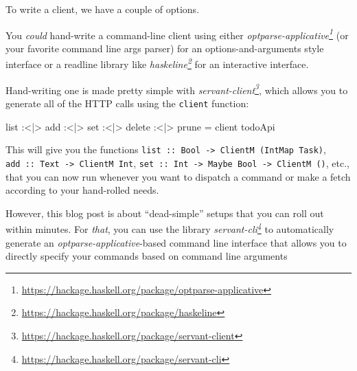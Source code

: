 \documentclass[]{article}
\newenvironment{Shaded}{}{}
\newcommand{\NormalTok}[1]{#1}
\newcommand{\OperatorTok}[1]{\textcolor[rgb]{0.40,0.40,0.40}{#1}}
\newcommand{\OtherTok}[1]{\textcolor[rgb]{0.00,0.44,0.13}{#1}}
\renewcommand{\href}[2]{#2\footnote{\url{#1}}}
\begin{document}
To write a client, we have a couple of options.

You \emph{could} hand-write a command-line client using either
\emph{\href{https://hackage.haskell.org/package/optparse-applicative}{optparse-applicative}}
(or your favorite command line args parser) for an options-and-arguments style
interface or a readline library like
\emph{\href{https://hackage.haskell.org/package/haskeline}{haskeline}} for an
interactive interface.

Hand-writing one is made pretty simple with
\emph{\href{https://hackage.haskell.org/package/servant-client}{servant-client}},
which allows you to generate all of the HTTP calls using the \texttt{client}
function:

\begin{Shaded}
\begin{Highlighting}[]
\NormalTok{list }\OperatorTok{:\textless{}|\textgreater{}}\NormalTok{ add }\OperatorTok{:\textless{}|\textgreater{}}\NormalTok{ set }\OperatorTok{:\textless{}|\textgreater{}}\NormalTok{ delete }\OperatorTok{:\textless{}|\textgreater{}}\NormalTok{ prune }\OtherTok{=}\NormalTok{ client todoApi}
\end{Highlighting}
\end{Shaded}

This will give you the functions
\texttt{list\ ::\ Bool\ -\textgreater{}\ ClientM\ (IntMap\ Task)},
\texttt{add\ ::\ Text\ -\textgreater{}\ ClientM\ Int},
\texttt{set\ ::\ Int\ -\textgreater{}\ Maybe\ Bool\ -\textgreater{}\ ClientM\ ()},
etc., that you can now run whenever you want to dispatch a command or make a
fetch according to your hand-rolled needs.

However, this blog post is about ``dead-simple'' setups that you can roll out
within minutes. For \emph{that}, you can use the library
\emph{\href{https://hackage.haskell.org/package/servant-cli}{servant-cli}} to
automatically generate an \emph{optparse-applicative}-based command line
interface that allows you to directly specify your commands based on command
line arguments
\end{document}
